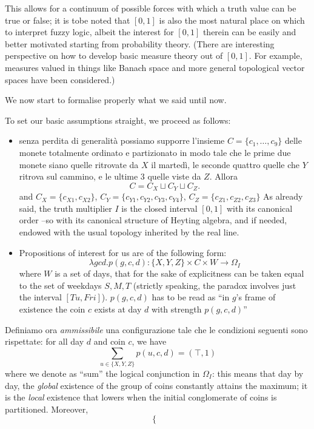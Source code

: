 \begin{example}
\begin{remark}
		This allows for a continuum of possible forces with which a truth value can be true or false;  it is tobe noted that $[0,1]$ is also the most natural place on which to interpret fuzzy logic, albeit the interest for $[0,1]$ therein can be easily and better motivated starting from probability theory. (There are interesting perspective on how to develop basic measure theory out of $[0,1]$. For example, measures valued in things like Banach space and more general topological	vector spaces have been considered.)
	\end{remark}
	We now start to formalise properly what we said until now.

	To set our basic assumptions straight, we proceed as follows:
	\begin{itemize}
		\item senza perdita di generalità possiamo supporre l'insieme $C = \{c_1,\dots,c_9\}$ delle monete totalmente ordinato e partizionato in modo tale che le prime due monete siano quelle ritrovate da $X$ il martedì, le seconde quattro quelle che $Y$ ritrova sul cammino, e le ultime 3 quelle viste da $Z$. Allora
		      \[C = C_X \sqcup C_Y \sqcup C_Z.\]
		      and $C_X = \{c_{X1}, c_{X2}\}$, $C_Y = \{
			      c_{Y1},c_{Y2},c_{Y3},c_{Y4}\}$, $C_Z= \{c_{Z1}, c_{Z2}, c_{Z3}\}$ As already said, the truth multiplier $I$ is the closed interval $[0,1]$ with its canonical order --so with its canonical structure of Heyting algebra, and if needed, endowed with the usual topology inherited by the real line.
		\item Propositions of interest for us are of the following form:
		      \[\lambda gcd.p(g, c, d) : \{X,Y,Z\}\times C\times W \to \Omega_I\]
		      where $W$ is a set of days, that for the sake of explicitness can be taken equal to the set of weekdays $S,M,T$ (strictly speaking, the paradox involves just the interval $[Tu,Fri]$). $p(g,c,d)$ has to be read as ``in $g$'s frame of existence the coin $c$ exists at day $d$ with strength $p(g,c,d)$''
	\end{itemize}
	Definiamo ora \emph{ammissibile} una configurazione tale che le condizioni seguenti sono rispettate: for all day $d$ and coin $c$, we have
	\[
		\sum_{u\in \{X,Y,Z\}} p(u,c,d) = (\top, 1)
	\]
	where we denote as ``sum'' the logical conjunction in $\Omega_I$: this means that day by day, the \emph{global} existence of the group of coins constantly attains the maximum; it is the \emph{local} existence that lowers when the initial conglomerate of coins is partitioned. Moreover,
	\[
		\begin{cases}

\end{cases}\]
\end{example}
